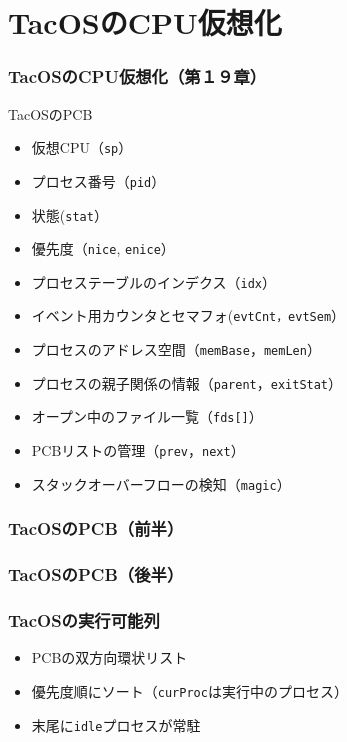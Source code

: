 \documentclass[unicode]{beamer}                   %
\begin{document}
\section{TacOSのCPU仮想化}
\begin{frame}
  \frametitle{TacOSのCPU仮想化（第１９章）}
  TacOSのPCB
  \begin{itemize}
    \item 仮想CPU（\texttt{sp}）
    \item プロセス番号（\texttt{pid}）
    \item 状態(\texttt{stat}）
    \item 優先度（\texttt{nice}, \texttt{enice}）
    \item プロセステーブルのインデクス（\texttt{idx}）
    \item イベント用カウンタとセマフォ(\texttt{evtCnt，evtSem}）
    \item プロセスのアドレス空間（\texttt{memBase}，\texttt{memLen}）
    \item プロセスの親子関係の情報（\texttt{parent}，\texttt{exitStat}）
    \item オープン中のファイル一覧（\texttt{fds[]}）
    \item PCBリストの管理（\texttt{prev}，\texttt{next}）
    \item スタックオーバーフローの検知（\texttt{magic}）
  \end{itemize}
\end{frame}

\begin{frame}
  \frametitle{TacOSのPCB（前半）}
  \vspace{-5mm}
\end{frame}

\begin{frame}
  \frametitle{TacOSのPCB（後半）}
\end{frame}

\begin{frame}
  \frametitle{TacOSの実行可能列}
  \begin{itemize}
    \item PCBの双方向環状リスト
    \item 優先度順にソート（\texttt{curProc}は実行中のプロセス）
    \item 末尾に\texttt{idle}プロセスが常駐 \\
      \vfill
  \end{itemize}
  \vfill
\end{frame}
\end{document}
